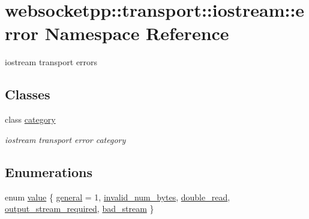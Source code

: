 \hypertarget{namespacewebsocketpp_1_1transport_1_1iostream_1_1error}{}\section{websocketpp\+:\+:transport\+:\+:iostream\+:\+:error Namespace Reference}
\label{namespacewebsocketpp_1_1transport_1_1iostream_1_1error}


iostream transport errors  


\subsection*{Classes}
\begin{DoxyCompactItemize}
\item 
class \mbox{\hyperlink{classwebsocketpp_1_1transport_1_1iostream_1_1error_1_1category}{category}}
\begin{DoxyCompactList}\small\item\em iostream transport error category \end{DoxyCompactList}\end{DoxyCompactItemize}
\subsection*{Enumerations}
\begin{DoxyCompactItemize}
\item 
enum \mbox{\hyperlink{namespacewebsocketpp_1_1transport_1_1iostream_1_1error_a647b428e260748d7606c92255e1e9737}{value}} \{ \newline
\mbox{\hyperlink{namespacewebsocketpp_1_1transport_1_1iostream_1_1error_a647b428e260748d7606c92255e1e9737a509b29b678dabf2fa2776636b3ba3c98}{general}} = 1, 
\mbox{\hyperlink{namespacewebsocketpp_1_1transport_1_1iostream_1_1error_a647b428e260748d7606c92255e1e9737aa185b313b5353e821c3fce4bf62f50a6}{invalid\+\_\+num\+\_\+bytes}}, 
\mbox{\hyperlink{namespacewebsocketpp_1_1transport_1_1iostream_1_1error_a647b428e260748d7606c92255e1e9737ac1ae213118c53b4d7eceb10876d88266}{double\+\_\+read}}, 
\mbox{\hyperlink{namespacewebsocketpp_1_1transport_1_1iostream_1_1error_a647b428e260748d7606c92255e1e9737a92341254bd27c7cb97fb5e1aca5310f3}{output\+\_\+stream\+\_\+required}}, 
\newline
\mbox{\hyperlink{namespacewebsocketpp_1_1transport_1_1iostream_1_1error_a647b428e260748d7606c92255e1e9737ad46c640654d1d96c517444d95d24da45}{bad\+\_\+stream}}
 \}
\end{DoxyCompactItemize}

